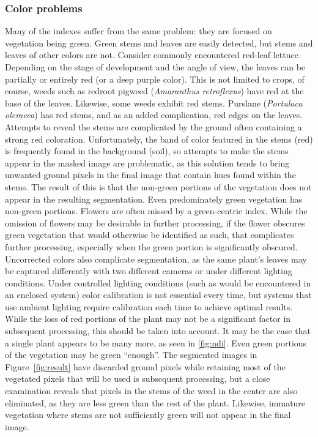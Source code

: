 \documentclass[letterpaper]{article}
\begin{document}
{\subsubsection{Color problems}
\label{section:problems-color}
Many of the indexes suffer from the same problem: they are focused on vegetation being green. Green stems and leaves are easily detected, but stems and leaves of other colors are not. Consider commonly encountered red-leaf lettuce. Depending on the stage of development and the angle of view, the leaves can be partially or entirely red (or a deep purple color). This is not limited to crops, of course, weeds such as redroot pigweed (\textit{Amaranthus retroflexus}) have red at the base of the leaves. Likewise, some weeds exhibit red stems. Purslane (\textit{Portulaca oleracea}) has red stems, and as an added complication, red edges on the leaves. Attempts to reveal the stems are complicated by the ground often containing a strong red coloration. Unfortunately, the band of color featured in the stems (red) is frequently found in the background (soil), so attempts to make the stems appear in the masked image are problematic, as this solution tends to bring unwanted ground pixels in the final image that contain hues found within the stems. The result of this is that the non-green portions of the vegetation does not appear in the resulting segmentation.  Even predominately green vegetation has non-green portions. Flowers are often missed by a green-centric index. While the omission of flowers may be desirable in further processing, if the flower obscures green vegetation that would otherwise be identified as such, that complicates further processing, especially when the green portion is significantly obscured. Uncorrected colors also complicate segmentation, as the same plant's leaves may be captured differently with two different cameras or under different lighting conditions. Under controlled lighting conditions (such as would be encountered in an enclosed system) color calibration is not essential every time, but systems that use ambient lighting require calibration each time to achieve optimal results. While the loss of red portions of the plant may not be a significant factor in subsequent processing, this should be taken into account. It may be the case that a single plant appears to be many more, as seen in \ref{fig:ndi}.
Even green portions of the vegetation may be green ``enough''. The segmented images in Figure~\ref{fig:result} have discarded ground pixels while retaining most of the vegetated pixels that will be used is subsequent processing, but a close examination reveals that pixels in the stems of the weed in the center are also eliminated, as they are less green than the rest of the plant. Likewise, immature vegetation where stems are not sufficiently green will not appear in the final image.

}
\end{document}
